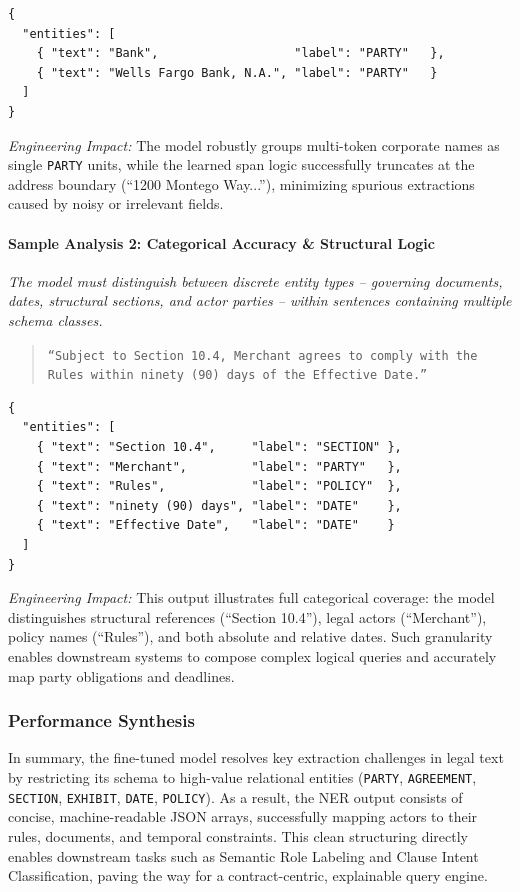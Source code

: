 \documentclass[twoside,final]{hcmut-report}
\begin{document}
\begin{verbatim}
{
  "entities": [
    { "text": "Bank",                   "label": "PARTY"   },
    { "text": "Wells Fargo Bank, N.A.", "label": "PARTY"   }
  ]
}
\end{verbatim}

\noindent
\textit{Engineering Impact:} The model robustly groups multi-token corporate names as single \texttt{PARTY} units, while the learned span logic successfully truncates at the address boundary (``1200 Montego Way...''), minimizing spurious extractions caused by noisy or irrelevant fields.

\paragraph{Sample Analysis 2: Categorical Accuracy \& Structural Logic}
\textit{The model must distinguish between discrete entity types -- governing documents, dates, structural sections, and actor parties -- within sentences containing multiple schema classes.}

\begin{quote}
  \texttt{``Subject to Section 10.4, Merchant agrees to comply with the Rules within ninety (90) days of the Effective Date.''}
\end{quote}

\begin{verbatim}
{
  "entities": [
    { "text": "Section 10.4",     "label": "SECTION" },
    { "text": "Merchant",         "label": "PARTY"   },
    { "text": "Rules",            "label": "POLICY"  },
    { "text": "ninety (90) days", "label": "DATE"    },
    { "text": "Effective Date",   "label": "DATE"    }
  ]
}
\end{verbatim}

\noindent
\textit{Engineering Impact:} This output illustrates full categorical coverage: the model distinguishes structural references (``Section 10.4''), legal actors (``Merchant''), policy names (``Rules''), and both absolute and relative dates. Such granularity enables downstream systems to compose complex logical queries and accurately map party obligations and deadlines.

\subsubsection*{Performance Synthesis}

In summary, the fine-tuned model resolves key extraction challenges in legal text by restricting its schema to high-value relational entities (\texttt{PARTY}, \texttt{AGREEMENT}, \texttt{SECTION}, \texttt{EXHIBIT}, \texttt{DATE}, \texttt{POLICY}). As a result, the NER output consists of concise, machine-readable JSON arrays, successfully mapping actors to their rules, documents, and temporal constraints. This clean structuring directly enables downstream tasks such as Semantic Role Labeling and Clause Intent Classification, paving the way for a contract-centric, explainable query engine.
\end{document}
